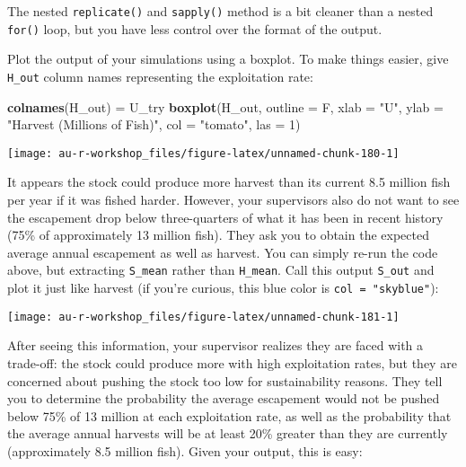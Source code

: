 \documentclass[]{book}
\newenvironment{Shaded}{\begin{snugshade}}{\end{snugshade}}
\newcommand{\KeywordTok}[1]{\textcolor[rgb]{0.13,0.29,0.53}{\textbf{#1}}}
\newcommand{\DataTypeTok}[1]{\textcolor[rgb]{0.13,0.29,0.53}{#1}}
\newcommand{\DecValTok}[1]{\textcolor[rgb]{0.00,0.00,0.81}{#1}}
\newcommand{\StringTok}[1]{\textcolor[rgb]{0.31,0.60,0.02}{#1}}
\newcommand{\NormalTok}[1]{#1}
\theoremstyle{definition}
\theoremstyle{definition}
\theoremstyle{definition}
\theoremstyle{remark}
\begin{document}
The nested \texttt{replicate()} and \texttt{sapply()} method is a bit
cleaner than a nested \texttt{for()} loop, but you have less control
over the format of the output.

Plot the output of your simulations using a boxplot. To make things
easier, give \texttt{H\_out} column names representing the exploitation
rate:

\begin{Shaded}
\begin{Highlighting}[]
\KeywordTok{colnames}\NormalTok{(H_out) =}\StringTok{ }\NormalTok{U_try}
\KeywordTok{boxplot}\NormalTok{(H_out, }\DataTypeTok{outline =}\NormalTok{ F,}
        \DataTypeTok{xlab =} \StringTok{"U"}\NormalTok{, }\DataTypeTok{ylab =} \StringTok{"Harvest (Millions of Fish)"}\NormalTok{,}
        \DataTypeTok{col =} \StringTok{"tomato"}\NormalTok{, }\DataTypeTok{las =} \DecValTok{1}\NormalTok{)}
\end{Highlighting}
\end{Shaded}

\begin{center}\texttt{[image: au-r-workshop\_files/figure-latex/unnamed-chunk-180-1]} \end{center}

It appears the stock could produce more harvest than its current 8.5
million fish per year if it was fished harder. However, your supervisors
also do not want to see the escapement drop below three-quarters of what
it has been in recent history (75\% of approximately 13 million fish).
They ask you to obtain the expected average annual escapement as well as
harvest. You can simply re-run the code above, but extracting
\texttt{S\_mean} rather than \texttt{H\_mean}. Call this output
\texttt{S\_out} and plot it just like harvest (if you're curious, this
blue color is \texttt{col\ =\ "skyblue"}):

\begin{center}\texttt{[image: au-r-workshop\_files/figure-latex/unnamed-chunk-181-1]} \end{center}

After seeing this information, your supervisor realizes they are faced
with a trade-off: the stock could produce more with high exploitation
rates, but they are concerned about pushing the stock too low for
sustainability reasons. They tell you to determine the probability the
average escapement would not be pushed below 75\% of 13 million at each
exploitation rate, as well as the probability that the average annual
harvests will be at least 20\% greater than they are currently
(approximately 8.5 million fish). Given your output, this is easy:
\end{document}

